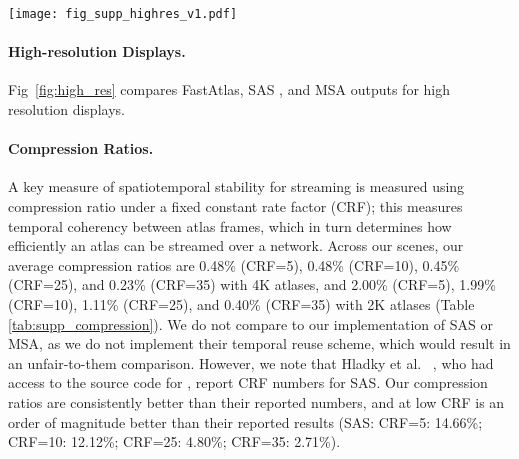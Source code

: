\begin{figure*}
\texttt{[image: fig\_supp\_highres\_v1.pdf]}
\caption{On 4K displays (3840 $\times$ 2160), MSA \cite{Neff2022MSA} cannot faithfully preserve even large-scale details such as the floor (b); SAS \cite{mueller2018shading} exhibits severe texture stretch artifacts (c). FastAtlas successfully handles this challenging case (d). Please zoom in for 4K pictures.}
\label{fig:high_res}
\end{figure*}

\paragraph*{High-resolution Displays.}  Fig~\ref{fig:high_res} compares FastAtlas, SAS \cite{mueller2018shading}, and MSA \cite{Neff2022MSA} outputs for high resolution displays.



\paragraph*{Compression Ratios.} A key measure of spatiotemporal stability for streaming is measured using compression ratio under a fixed constant rate factor (CRF); this measures temporal coherency between atlas frames, which in turn determines how efficiently an atlas can be streamed over a network. Across our scenes, our average compression ratios are 0.48\% (CRF=5), 0.48\% (CRF=10), 0.45\% (CRF=25), and 0.23\% (CRF=35) with 4K atlases, and 2.00\% (CRF=5), 1.99\% (CRF=10), 1.11\% (CRF=25), and 0.40\% (CRF=35) with 2K atlases (Table \ref{tab:supp_compression}). We do not compare to our implementation of SAS or MSA, as we do not implement their temporal reuse scheme, which would result in an unfair-to-them comparison. However, we note that Hladky et al. ~, who had access to the source code for \cite{mueller2018shading}, report CRF numbers for SAS. Our compression ratios are consistently better than their reported numbers, and at low CRF is an order of magnitude better than their reported results (SAS: CRF=5: 14.66\%; CRF=10: 12.12\%; CRF=25: 4.80\%; CRF=35: 2.71\%).

